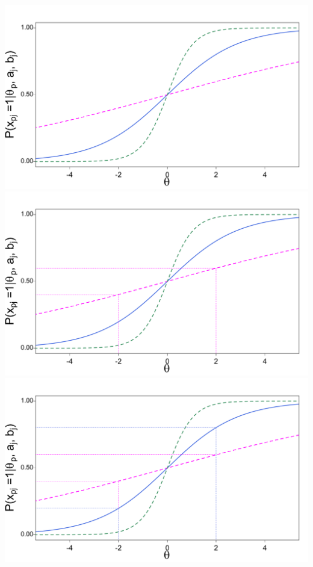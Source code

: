 \documentclass{beamer} %
\begin{document}
\begin{frame}
	\begin{overprint}
		\includegraphics[width=\linewidth]{img/item}
		\onslide<2>
		\includegraphics[width=\linewidth]{img/itemA}
		\onslide<3>
\includegraphics[width=\linewidth]{img/itemB}

\end{overprint}
\end{frame}
\end{document}
